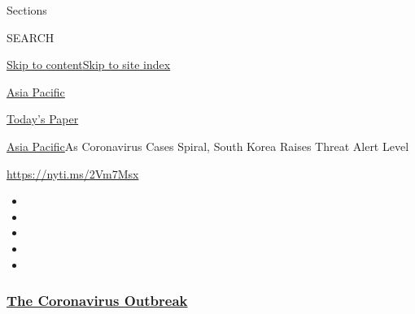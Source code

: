 Sections

SEARCH

\protect\hyperlink{site-content}{Skip to
content}\protect\hyperlink{site-index}{Skip to site index}

\href{https://www.nytimes3xbfgragh.onion/section/world/asia}{Asia
Pacific}

\href{https://myaccount.nytimes3xbfgragh.onion/auth/login?response_type=cookie\&client_id=vi}{}

\href{https://www.nytimes3xbfgragh.onion/section/todayspaper}{Today's
Paper}

\href{/section/world/asia}{Asia Pacific}\textbar{}As Coronavirus Cases
Spiral, South Korea Raises Threat Alert Level

\url{https://nyti.ms/2Vm7Msx}

\begin{itemize}
\item
\item
\item
\item
\item
\end{itemize}

\hypertarget{the-coronavirus-outbreak}{%
\subsubsection{\texorpdfstring{\href{https://www.nytimes3xbfgragh.onion/news-event/coronavirus?name=styln-coronavirus-national\&region=TOP_BANNER\&variant=undefined\&block=storyline_menu_recirc\&action=click\&pgtype=Article\&impression_id=0d975c00-e109-11ea-a073-25c439efb2c1}{The
Coronavirus
Outbreak}}{The Coronavirus Outbreak}}\label{the-coronavirus-outbreak}}

